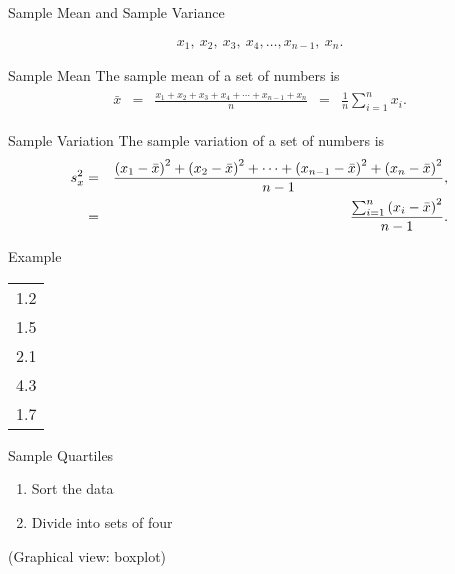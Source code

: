 \begin{frame}{Sample Mean and Sample Variance}

  \begin{eqnarray*}
    x_1,~x_2,~x_3,~x_4,\ldots,x_{n-1},~x_n.
  \end{eqnarray*}

  \begin{definition}{Sample Mean}
    The sample mean of a set of numbers is 
    \begin{eqnarray*}
      \begin{array}{lclcl}
        \bar{x} & = & \frac{x_1+x_2+x_3+x_4+\cdots+x_{n-1}+x_n}{n}
        & = & \frac{1}{n}\sum^n_{i=1} x_i.
    \end{array}
    \end{eqnarray*}
  \end{definition}

  \begin{definition}{Sample Variation}
    The sample variation of a set of numbers is 
    \begin{eqnarray*}
      s^2_x & = & \frac{\left( x_1-\bar{x}\right)^2 + \left( x_2-\bar{x}\right)^2 +
                  \cdots+\left( x_{n-1} - \bar{x} \right)^2 + \left( x_n - \bar{x}\right)^2}{n-1}, \\
      & = & \frac{\sum^n_{i=1} \left( x_i - \bar{x} \right)^2 }{n-1}.
    \end{eqnarray*}
  \end{definition}

  
\end{frame}

\begin{frame}{Example}

  \begin{tabular}{l}
    1.2 \\ 1.5 \\ 2.1 \\ 4.3 \\ 1.7
  \end{tabular}

\end{frame}

\begin{frame}{Sample Quartiles}

  \begin{enumerate}
  \item Sort the data
  \item Divide into sets of four
  \end{enumerate}

  (Graphical view: boxplot)
  
\end{frame}

